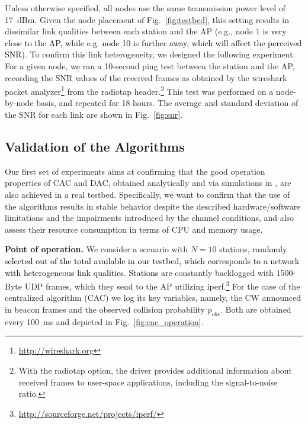 \documentclass[a4paper,10pt]{article}
\newcommand{\revs}[1]{\textcolor{black}{#1}}
\begin{document}
Unless otherwise specified, all nodes use the same transmission power level of 17~dBm. Given the node placement of Fig.~\ref{fig:testbed}, this setting results in dissimilar link qualities between each station and the AP (e.g., node 1 is \revs{very close to the AP, while e.g. node 10 is further away, which will affect the perceived SNR}). To confirm this link heterogeneity, we designed the following experiment. For a given node, we ran a 10-second {\ttfamily ping} test between the station and the AP, recording the SNR values of the received frames as obtained by the {\ttfamily wireshark} packet analyzer\footnote{\url{http://wireshark.org}} from the {\ttfamily radiotap} header.\footnote{With the {\ttfamily radiotap} option, the driver provides additional information about received frames to user-space applications, including the signal-to-noise ratio.} This test was performed on a node-by-node basis, and repeated for 18 hours. The average and standard deviation of the SNR for each link are shown in Fig.~\ref{fig:snr}. 



\subsection{Validation of the Algorithms}

Our first set of experiments aims at confirming that the good operation properties of CAC and DAC, obtained analytically and via simulations in \cite{patras09monet,patras10tmc}, are also achieved in a real testbed. Specifically, we want to confirm that the use of the algorithms results in stable behavior despite the described hardware/software limitations and the impairments introduced by the channel conditions, and also assess their resource consumption in terms of CPU and memory usage.

\vspace{0.25em}
{\bf Point of operation.} We consider a scenario with $N=10$ stations, \revs{randomly selected out of the total available in our testbed, which corresponds to a network with heterogeneous link qualities. Stations are} constantly backlogged with 1500-Byte UDP frames, which they send to the AP utilizing {\ttfamily iperf}.\footnote{{\ttfamily \url{http://sourceforge.net/projects/iperf/}}} For the case of the centralized algorithm (CAC) we log its key variables, namely, the {\ttfamily CW} announced in beacon frames and the observed collision probability $p_{obs}$. Both are obtained every 100~ms and depicted in Fig.~\ref{fig:cac_operation}. 
\end{document}
